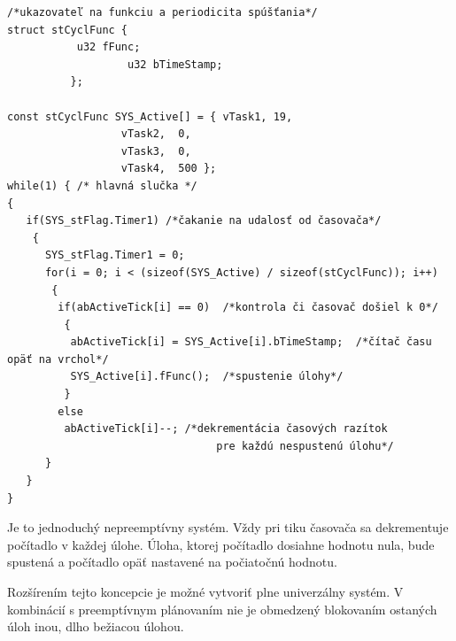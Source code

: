 {\small
\begin{verbatim}
/*ukazovateľ na funkciu a periodicita spúšťania*/
struct stCyclFunc {
		   u32 fFunc;
                   u32 bTimeStamp;
		  };

const stCyclFunc SYS_Active[] = { vTask1, 19,
				  vTask2,  0, 
				  vTask3,  0,
				  vTask4,  500 };
while(1) { /* hlavná slučka */
{
   if(SYS_stFlag.Timer1) /*čakanie na udalosť od časovača*/
    {
      SYS_stFlag.Timer1 = 0;
      for(i = 0; i < (sizeof(SYS_Active) / sizeof(stCyclFunc)); i++)
       {
        if(abActiveTick[i] == 0)  /*kontrola či časovač došiel k 0*/
         {
          abActiveTick[i] = SYS_Active[i].bTimeStamp;  /*čítač času opäť na vrchol*/
          SYS_Active[i].fFunc();  /*spustenie úlohy*/
         }
        else 
         abActiveTick[i]--; /*dekrementácia časových razítok
                                 pre každú nespustenú úlohu*/
      }
   }
}
\end{verbatim}
}

Je to jednoduchý nepreemptívny systém. Vždy pri tiku časovača sa dekrementuje počítadlo v každej úlohe. Úloha, ktorej počítadlo dosiahne hodnotu nula, bude spustená a počítadlo opäť nastavené na počiatočnú hodnotu. 

Rozšírením tejto koncepcie je možné vytvoriť plne univerzálny systém. V kombinácií s preemptívnym plánovaním nie je obmedzený blokovaním ostaných úloh inou, dlho bežiacou úlohou. 

